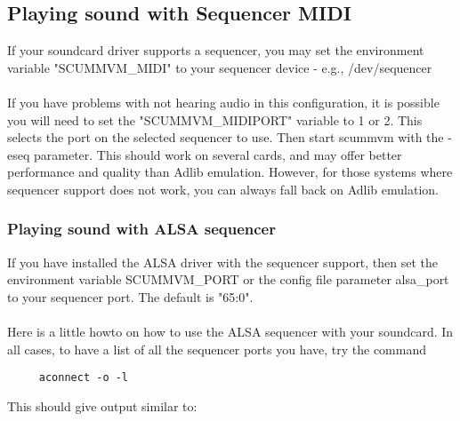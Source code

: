 

\subsection{Playing sound with Sequencer MIDI}

If your soundcard driver supports a sequencer, you may set the environment
variable "SCUMMVM\_MIDI" to your sequencer device - e.g., /dev/sequencer\\
~\\
If you have problems with not hearing audio in this configuration, it is
possible you will need to set the "SCUMMVM\_MIDIPORT" variable to 1 or 2. This
selects the port on the selected sequencer to use. Then start scummvm with the
-eseq parameter. This should work on several cards, and may offer better
performance and quality than Adlib emulation. However, for those systems where
sequencer support does not work, you can always fall back on Adlib emulation.


\subsubsection{Playing sound with ALSA sequencer}

If you have installed the ALSA driver with the sequencer support, then
set the environment variable SCUMMVM\_PORT or the config file parameter
alsa\_port to your sequencer port. The default is "65:0".\\
~\\
Here is a little howto on how to use the ALSA sequencer with your soundcard.
In all cases, to have a list of all the sequencer ports you have, try the
command 
\begin{verbatim}
     aconnect -o -l
\end{verbatim}
This should give output similar to:

